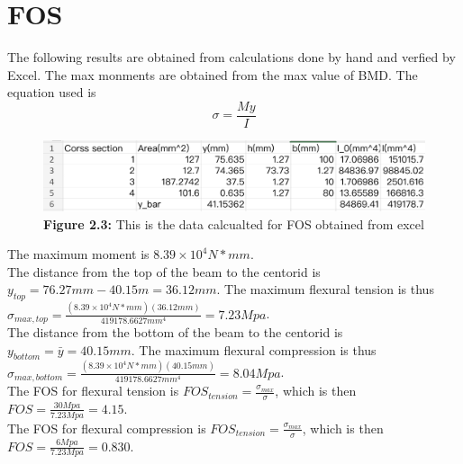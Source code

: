 \documentclass[12pt,titlepage,a4paper]{article}
\begin{document}
    \section{FOS}
        The following results are obtained from calculations done by hand and verfied by Excel. 
        The max monments are obtained from the max value of BMD. The equation used is
        \begin{equation}
            \sigma = \frac{My}{I}
        \end{equation}
        \begin{figure}[H]
            \centering
            \includegraphics[width=13cm]{m_and_centorid.png}
            \caption*{\textbf{Figure 2.3:} This is the data calcualted for FOS obtained from excel}
            \label{fig:enter-label}
        \end{figure}
        The maximum moment is $8.39\times10^4 N*mm$. \\The distance from the top of the beam to the centorid is 
        $y_{top} = 76.27mm - 40.15m = 36.12mm$. The maximum flexural tension is thus $\sigma_{max, top} = \frac{(8.39\times10^4 N*mm)
        (36.12mm)}{419178.6627mm^4} = 7.23Mpa$. \\The distance from the bottom of the beam to the centorid is 
        $y_{bottom} = \bar{y} = 40.15mm$. The maximum flexural compression is thus $\sigma_{max, bottom} = \frac{(8.39\times10^4 N*mm)
        (40.15mm)}{419178.6627mm^4} = 8.04Mpa$. \\
        The FOS for flexural tension is $FOS_{tension} = \frac{\sigma_{max}}{\sigma}$, which is then $FOS = \frac{30Mpa}{7.23Mpa} = 4.15$.
        \\The FOS for flexural compression is $FOS_{tension} = \frac{\sigma_{max}}{\sigma}$, which is then $FOS = \frac{6Mpa}{7.23Mpa} = 0.830$.
\end{document}

